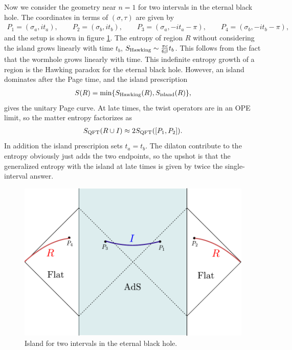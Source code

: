 \documentclass[12pt]{article}
\newcommand{\f}{\frac}
\let\f=\frac
\def\ba{\begin{eqnarray}}
\def\ea{\end{eqnarray}}
\numberwithin{equation}{section}
\def\ba{\begin{eqnarray}}
\def\ea{\end{eqnarray}}
\def\f {\frac}
\begin{document}
\begin{spacing}{1.1}
 Now we consider the geometry near $n=1$ for two intervals in the eternal black hole. The coordinates in terms of $(\sigma, \tau)$ are given by
 \ba
P_1 = (\sigma_a, i t_a), \qquad P_2 = (\sigma_b, i t_b), \qquad P_3 = (\sigma_a, -i t_a - \pi), \qquad P_4= (\sigma_b, -i t_b - \pi),
\ea 
 and the setup is shown in figure \ref{fig:twointerval}. The  entropy of region $R$ without considering the island grows linearly with time $t_b$, $S_{\rm Hawking} \sim \f{\pi c}{6 \beta} t_b$. This follows from  the fact that the wormhole grows linearly with time\cite{Hartman:2013qma,Susskind:2014moa}. This indefinite entropy growth of a region is the Hawking paradox for the eternal black hole.  However, an island dominates after the Page time, and the island prescription
\ba 
S(R) = \text{min} \{ S_{\rm Hawking} (R), S_{\rm island} (R)\},
\ea
gives the unitary Page curve. 
At late times, the twist operators are in an OPE limit, so the matter entropy factorizes as
\ba 
S_{\rm QFT} (R \cup I) \approx 2 S_{\rm QFT} ([P_1, P_2]).
\ea 
In addition the  island prescripion sets $t_a= t_b$. The dilaton contribute to the entropy obviously just adds the two endpoints, so the upshot is that the generalized entropy with the island at late times is given by twice the single-interval answer. 
\begin{figure}[h!]
\centering
\includegraphics[scale=0.74]{./figures/eternalBH-lorentzian.pdf}
\caption{Island for two intervals in the eternal black hole.} \label{fig:twointerval}
\end{figure}


\end{spacing}
\end{document}

